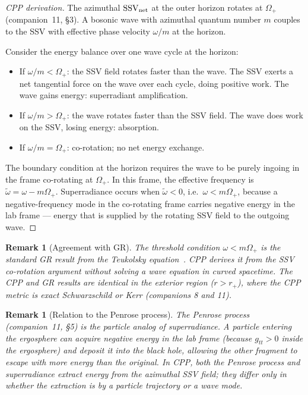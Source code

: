 \documentclass[12pt]{article}
\newtheorem{remark}[theorem]{Remark}
\newcommand{\rplus}{r_+}
\newcommand{\Oplus}{\Omega_+}
\newcommand{\SSV}{\mathrm{SSV}}
\begin{document}
\begin{proof}[CPP derivation]
The azimuthal $\SSV_{\rm net}$ at the outer horizon rotates at $\Oplus$
(companion~11, §3).  A bosonic wave with azimuthal quantum number $m$
couples to the SSV with effective phase velocity $\omega/m$ at the
horizon.

Consider the energy balance over one wave cycle at the horizon:
\begin{itemize}[noitemsep]
  \item If $\omega/m < \Oplus$: the SSV field rotates faster than the
    wave.  The SSV exerts a net tangential force on the wave over each
    cycle, doing positive work.  The wave gains energy: superradiant
    amplification.
  \item If $\omega/m > \Oplus$: the wave rotates faster than the SSV
    field.  The wave does work on the SSV, losing energy: absorption.
  \item If $\omega/m = \Oplus$: co-rotation; no net energy exchange.
\end{itemize}
The boundary condition at the horizon requires the wave to be purely
ingoing in the frame co-rotating at $\Oplus$.  In this frame, the
effective frequency is $\tilde\omega = \omega - m\Oplus$.  Superradiance
occurs when $\tilde\omega < 0$, i.e.\ $\omega < m\Oplus$, because a
negative-frequency mode in the co-rotating frame carries negative
energy in the lab frame — energy that is supplied by the rotating
SSV field to the outgoing wave.
\end{proof}

\begin{remark}[Agreement with GR]
The threshold condition $\omega < m\Oplus$ is the standard GR result
from the Teukolsky equation~\cite{teukolsky1973}.  CPP derives it
from the SSV co-rotation argument without solving a wave equation in
curved spacetime.  The CPP and GR results are identical in the exterior
region ($r > \rplus$), where the CPP metric is exact Schwarzschild
or Kerr (companions 8 and 11).
\end{remark}

\begin{remark}[Relation to the Penrose process]
The Penrose process (companion~11, §5) is the particle analog of
superradiance.  A particle entering the ergosphere can acquire
negative energy in the lab frame (because $g_{tt} > 0$ inside the
ergosphere) and deposit it into the black hole, allowing the other
fragment to escape with more energy than the original.  In CPP, both
the Penrose process and superradiance extract energy from the azimuthal
SSV field; they differ only in whether the extraction is by a particle
trajectory or a wave mode.
\end{remark}
\end{document}
